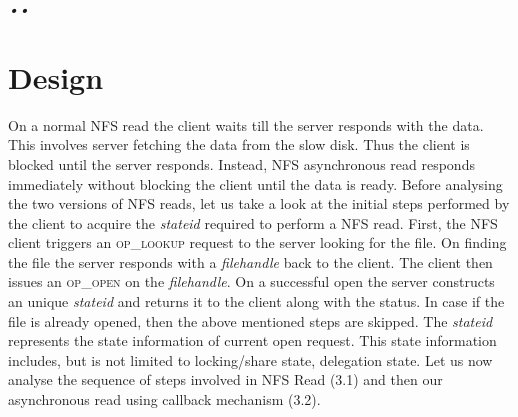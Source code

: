 \textit{\emph{•\emph{\textit{•}}}}\section{Design}

\label{Design}

On a normal NFS read the client waits till the server responds with the data. This involves server fetching the data from the slow disk. Thus the client is blocked until the server responds. Instead, NFS asynchronous read responds immediately without blocking the client until the data is ready. Before analysing the two versions of NFS reads, let us take a look at the initial steps performed by the client to acquire the \textit{stateid} required to perform a NFS read. First, the NFS client triggers an \textsc{op\_lookup} request to the server looking for the file. On finding the file the server responds with a \textit{filehandle} back to the client. The client then issues an \textsc{op\_open} on the 
\textit{filehandle}. On a successful open the server constructs an unique \textit{stateid} and returns it to the client along with the status. In case if the file is already opened,    then the above mentioned steps are skipped. The \textit{stateid} represents the state information of current open request. This state information includes, but is not limited to locking/share state, delegation state. Let us now analyse the sequence of steps involved in NFS Read (3.1) and then our asynchronous read using callback mechanism (3.2).


